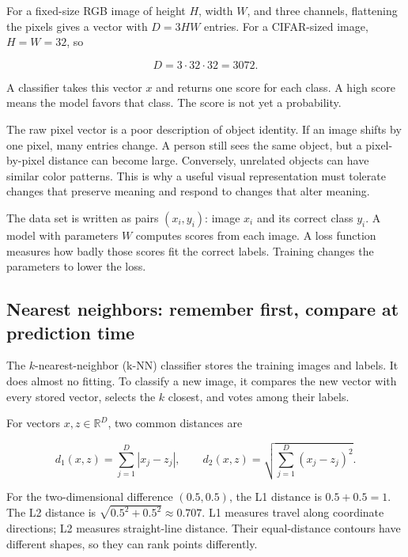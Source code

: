 For a fixed-size RGB image of height \(H\), width \(W\), and three channels, flattening the pixels gives a vector with \(D=3HW\) entries. For a CIFAR-sized image, \(H=W=32\), so

\[D=3\cdot32\cdot32=3072.\]

A classifier takes this vector \(x\) and returns one score for each class. A high score means the model favors that class. The score is not yet a probability.

The raw pixel vector is a poor description of object identity. If an image shifts by one pixel, many entries change. A person still sees the same object, but a pixel-by-pixel distance can become large. Conversely, unrelated objects can have similar color patterns. This is why a useful visual representation must tolerate changes that preserve meaning and respond to changes that alter meaning.

The data set is written as pairs \((x_i,y_i)\): image \(x_i\) and its correct class \(y_i\). A model with parameters \(W\) computes scores from each image. A loss function measures how badly those scores fit the correct labels. Training changes the parameters to lower the loss.

\subsection{Nearest neighbors: remember first, compare at prediction time}\label{04-visual-computing-ii-ch031-nearest-neighbors-remember-first-compare-at-prediction-time}

\hypertarget{04-visual-computing-ii-ch031-nearest-neighbors-remember-first-compare-at-prediction-time}{}

The \(k\)-nearest-neighbor (k-NN) classifier stores the training images and labels. It does almost no fitting. To classify a new image, it compares the new vector with every stored vector, selects the \(k\) closest, and votes among their labels.

For vectors \(x,z\in\mathbb{R}^D\), two common distances are

\[d_1(x,z)=\sum_{j=1}^{D}|x_j-z_j|, \qquad d_2(x,z)=\sqrt{\sum_{j=1}^{D}(x_j-z_j)^2}.\]

For the two-dimensional difference \((0.5,0.5)\), the L1 distance is \(0.5+0.5=1\). The L2 distance is \(\sqrt{0.5^2+0.5^2}\approx0.707\). L1 measures travel along coordinate directions; L2 measures straight-line distance. Their equal-distance contours have different shapes, so they can rank points differently.

